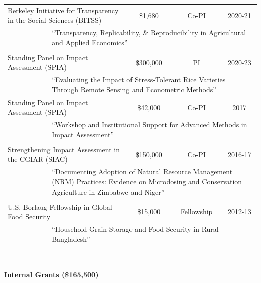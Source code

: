 \documentclass[letterpaper]{article}
\renewenvironment{itemize}{
  \begin{list}
  	{}{
    \setlength{\leftmargin}{1.5em}
    \setlength{\itemsep}{-.5em}
  }
}{
  \end{list}
}
\begin{document}
\begin{itemize}
	\begin{tabular}{llccc}
		\multicolumn{2}{l}{Berkeley Initiative for Transparency in the Social Sciences (BITSS)}	& \$1,680 	& Co-PI			& 2020-21 \\	
		& \multicolumn{4}{p{\linewidth}}{``Transparency, Replicability, \& Reproducibility in Agricultural and Applied Economics''} \\
        		&&&& \\
		\multicolumn{2}{l}{Standing Panel on Impact Assessment (SPIA)}	& \$300,000 	& PI			& 2020-23 \\	
		& \multicolumn{4}{p{\linewidth}}{``Evaluating the Impact of Stress-Tolerant Rice Varieties Through Remote Sensing and Econometric Methods''} \\
		\multicolumn{2}{l}{Standing Panel on Impact Assessment (SPIA)}	& \$42,000	& Co-PI			& 2017 \\	
		& \multicolumn{4}{p{\linewidth}}{``Workshop and Institutional Support for Advanced Methods in Impact Assessment''} \\
		&&&& \\
		\multicolumn{2}{l}{Strengthening Impact Assessment in the CGIAR (SIAC)}	& \$150,000	& Co-PI			& 2016-17 \\
		& \multicolumn{4}{p{\linewidth}}{``Documenting Adoption of Natural Resource Management (NRM) Practices: Evidence on Microdosing and Conservation Agriculture in Zimbabwe and Niger''} \\
		&&&& \\
		\multicolumn{2}{l}{U.S. Borlaug Fellowship in Global Food Security}	& \$15,000	& Fellowship	& 2012-13 \\
		& \multicolumn{4}{p{\linewidth}}{``Household Grain Storage and Food Security in Rural Bangladesh''} \\
	\end{tabular}
    \\	
	\leftskip 0in
	\item {\bf Internal Grants (\$165,500)} 


\end{itemize}
\end{document}
